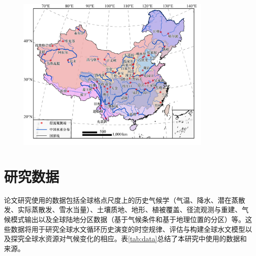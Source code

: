 \begin{figure}[H]
	\centering
	\includegraphics[width=0.85\textwidth]{figures/chap2/China_Stations.jpg}
	\label{fig:All_China_Stations}
\end{figure}

\section{研究数据}

论文研究使用的数据包括全球格点尺度上的历史气候学（气温、降水、潜在蒸散发、实际蒸散发、雪水当量）、土壤质地、地形、植被覆盖、径流观测与重建、气候模式输出以及全球陆地分区数据（基于气候条件和基于地理位置的分区）等。这些数据将用于研究全球水文循环历史演变的时空规律、评估与构建全球水文模型以及探究全球水资源对气候变化的相应。表\ref{tab:data}总结了本研究中使用的数据和来源。

